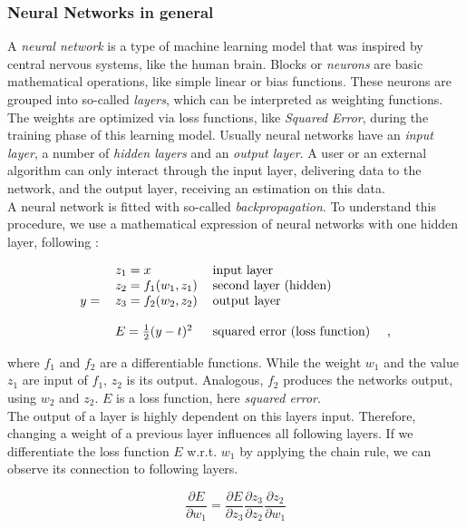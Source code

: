 \subsubsection{Neural Networks in general}
A \emph{neural network} is a type of machine learning model that was inspired by central nervous systems, like the human brain. Blocks or \emph{neurons} are basic mathematical operations, like simple linear or bias functions. These neurons are grouped into so-called \emph{layers}, which can be interpreted as weighting functions. The weights are optimized via loss functions, like \emph{Squared Error}, during the training phase of this learning model. Usually neural networks have an \emph{input layer}, a number of \emph{hidden layers} and an \emph{output layer}. A user or an external algorithm can only interact through the input layer, delivering data to the network, and the output layer, receiving an estimation on this data.\\
A neural network is fitted with so-called \emph{backpropagation}. To understand this procedure, we use a mathematical expression of neural networks with one hidden layer, following  \cite{harmeling18}:

\begin{eqnarray}\label{eqn:nn}
\begin{tabular}{r l l}
		&$z_1 = x$ & input layer\\
		&$z_2 = f_1(w_1,z_1)$ & second layer (hidden)\\
		$y =$&$z_3 = f_2(w_2,z_2)$ & output layer\\ \\
		&$E = \frac{1}{2}(y-t)^2$ & squared error (loss function) \hspace{1em},
\end{tabular}
\end{eqnarray}

where $f_1$ and $f_2$ are a differentiable functions. While the weight  $w_1$ and the value $z_1$ are input of $f_1$, $z_2$ is its output. Analogous, $f_2$ produces the networks output, using $w_2$ and $z_2$. $E$ is a loss function, here \emph{squared error}.\\
The output of a layer is highly dependent on this layers input. Therefore, changing a weight of a previous layer influences all following layers. If we differentiate the loss function $E$ w.r.t. $w_1$ by applying the chain rule, we can observe its connection to following layers.

\begin{equation}\label{eqn:nn_der}
\frac{\partial E}{\partial w_1} = \frac{\partial E}{\partial z_3} \frac{\partial z_3}{\partial z_2} \frac{\partial z_2}{\partial w_1}
\end{equation}

